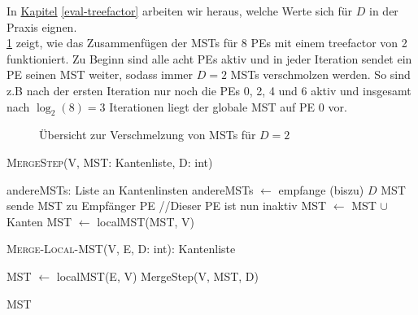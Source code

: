 In \hyperref[eval-treefactor]{Kapitel} \ref{eval-treefactor} arbeiten wir heraus, welche Werte sich für $D$ in der Praxis eignen.\\
\cref{MergeMST-Img} zeigt, wie das Zusammenfügen der MSTs für 8 PEs mit einem treefactor von 2 funktioniert. 
Zu Beginn sind alle acht PEs aktiv und in jeder Iteration sendet ein PE seinen MST weiter, sodass immer $D=2$ MSTs verschmolzen werden. So sind z.B nach der ersten Iteration nur noch die PEs 0, 2, 4 und 6 aktiv und insgesamt nach $\log_2(8) = 3$ Iterationen liegt der globale MST auf PE 0 vor.\\

\newpage
 

\begin{figure}[H]
    \centering
    
    \caption{Übersicht zur Verschmelzung von MSTs für $D=2$}
    \label{MergeMST-Img}
\end{figure}


\begin{algorithm} 
\caption{\textsc{MergeStep}(V, MST: Kantenliste, D: int)}
\begin{algorithmic}[1]
\label{MergeStep}
\STATE andereMSTs: Liste an Kantenlinsten
    \STATE andereMSTs $\gets$ empfange (biszu) $D$ MST 
\ELSE
    \STATE sende MST zu Empfänger PE
    \RETURN //Dieser PE ist nun inaktiv
\ENDIF
{}
    \STATE MST $\gets$ MST $\cup$ Kanten
\ENDFOR
\STATE MST $\leftarrow$ localMST(MST, V)
\end{algorithmic}
\end{algorithm}

\begin{algorithm} 
\caption{\textsc{Merge-Local-MST}(V, E, D: int): Kantenliste}
\begin{algorithmic}[1]
\label{Merge-Local-MST-Algo}
 
\STATE MST $\leftarrow$ localMST(E, V)
    \STATE MergeStep(V, MST, D)
\ENDFOR

\RETURN MST
\end{algorithmic}
\end{algorithm}



